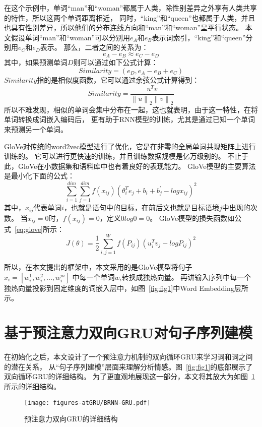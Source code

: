 在这个示例中，单词“man”和“woman”都属于人类，除性别差异之外享有人类共享的特性，所以这两个单词距离相近，
同时，“king”和“queen”也都属于人类，并且也具有性别差异，所以他们的分布连线方向和“man”和“woman”呈平行状态。
本文假设单词“man”和“woman”可以分别用${e_{A}}$和${e_{B}}$表示词索引，“king”和“queen”分别用${e_{C}}$和${e_{D}}$表示。
那么，二者之间的关系为：
\begin{equation}
e_{A}-e_{B}\approx e_{C}-e_{D}
\end{equation}
其中，如果预测单词${D}$则可以通过如下公式计算：
\begin{equation}
Similarity=\left( e_{D}, e_{A}-e_{B}+e_{C} \right)
\end{equation}
${Similarity}$指的是相似度函数，它可以通过余弦公式计算得到：
\begin{equation}
Similarity=\frac{u^{T}v}{\left \| u \right \|_{2}\left \| v \right \|_{2}}
\end{equation}
所以不难发现，相似的单词会集中分布在一起，这也就表明，由于这一特性，在将单词转换成词嵌入编码后，
更有助于RNN模型的训练，尤其是通过已知一个单词来预测另一个单词。

GloVe对传统的word2vec模型进行了优化，它是在非零的全局单词共现矩阵上进行训练的。
它可以进行更快速的训练，并且训练数据规模是亿万级别的。
不止于此，GloVe在小数据集和语料库中也有着良好的表现能力。
GloVe模型的主要算法是最小化下面的公式：
\begin{equation}
\sum_{i=1}^{dim}\sum_{j=1}^{dim}f\left ( x_{ij} \right )\left ( \theta _{i}^{T}e_{j} +b_{i}+b_{j}^{'}-logx_{ij}\right )^{2}
\end{equation}
其中，${x_{ij}}$代表单词${i}$，也就是语句中的目标，在前后文也就是目标语境${j}$中出现的次数。
当${x_{ij}=0}$时，${f\left ( x_{ij} \right )=0}$，定义${0log0=0}$。
GloVe模型的损失函数如公式~\ref{eq:glove}所示：
\begin{equation}
J\left ( \theta  \right )=\frac{1}{2}\sum_{i,j=1}^{W}f\left ( P_{ij} \right )\left ( u_{i}^{T}v_{j}-logP_{ij} \right )^{2}
\label{eq:glove}
\end{equation}

所以，在本文提出的框架中，本文采用的是GloVe模型将句子${x_{i}=\left[w_{i}^{1},w_{i}^{2},...,w_{i}^{m}\right]}$
中每一个单词${w_{i}}$转换成独热向量。
再讲输入序列中每一个独热向量投影到固定维度的词嵌入层中，如图~\ref{fig:fig1}中Word Embedding层所示。

\section{基于预注意力双向GRU对句子序列建模}
在初始化之后，本文设计了一个预注意力机制的双向循环GRU来学习词和词之间的潜在关系，
从“句子序列建模”层面来理解分析情感。图~\ref{fig:fig1}的底部展示了双向循环GRU的详细结构。
为了更直观地展现这一部分，本文将其放大为如图~\ref{fig:BRNN-GRU}所示的详细结构。
\begin{figure}[h!]
	\centering
	\texttt{[image: figures-atGRU/BRNN-GRU.pdf]}
	\caption{预注意力双向GRU的详细结构}
	\label{fig:BRNN-GRU}
\end{figure}

